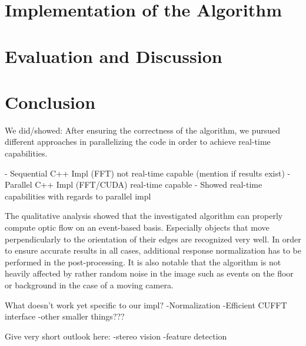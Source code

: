 \documentclass[a4paper,twoside, openright,12pt]{report}
\begin{document}
\newpage
\chapter{Implementation of the Algorithm}





\chapter{Evaluation and Discussion}





\chapter{Conclusion}

We did/showed:
After ensuring the correctness of the algorithm, we pursued different approaches in parallelizing the code in order to achieve real-time capabilities.

- Sequential C++ Impl (FFT) not real-time capable (mention if results exist)
- Parallel C++ Impl (FFT/CUDA) real-time capable
- Showed real-time capabilities with regards to parallel impl

The qualitative analysis showed that the investigated algorithm can properly compute optic flow on an event-based basis.
Especially objects that move perpendicularly to the orientation of their edges are recognized very well.
In order to ensure accurate results in all cases, additional response normalization has to be performed in the post-processing.
It is also notable that the algorithm is not heavily affected by rather random noise in the image such as events on the floor or background in the case of a moving camera.

What doesn't work yet specific to our impl? 
-Normalization
-Efficient CUFFT interface
-other smaller things???




Give very short outlook here:
-stereo vision
-feature detection


\end{document}
